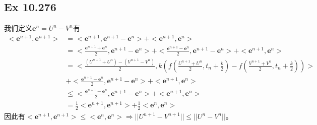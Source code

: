 \documentclass{article}
\begin{document}
\subsection*{Ex 10.276}
\indent 我们定义$\textbf{e}^{n}=U^{n}-V^{n}$有
\begin{equation*}
\begin{aligned}
<\textbf{e}^{n+1},\textbf{e}^{n+1}>&=<\textbf{e}^{n+1},\textbf{e}^{n+1}-\textbf{e}^{n}>+<\textbf{e}^{n+1},\textbf{e}^{n}>\\
&=<\frac{\textbf{e}^{n+1}+\textbf{e}^{n}}{2},\textbf{e}^{n+1}-\textbf{e}^{n}>+<\frac{\textbf{e}^{n+1}-\textbf{e}^{n}}{2},\textbf{e}^{n+1}-\textbf{e}^{n}>+<\textbf{e}^{n+1},\textbf{e}^n>\\
&=<\frac{(U^{n+1}+U^n)-(V^{n+1}-V^n)}{2},k(f(\frac{U^{n+1}+U^n}{2},t_n+\frac{k}{2})-f(\frac{V^{n+1}+V^n}{2},t_n+\frac{k}{2}))>\\
&+<\frac{\textbf{e}^{n+1}-\textbf{e}^{n}}{2},\textbf{e}^{n+1}-\textbf{e}^{n}>+<\textbf{e}^{n+1},\textbf{e}^n>\\
&\le<\frac{\textbf{e}^{n+1}-\textbf{e}^{n}}{2},\textbf{e}^{n+1}-\textbf{e}^{n}>+<\textbf{e}^{n+1},\textbf{e}^n>\\
&=\frac{1}{2}<\textbf{e}^{n+1},\textbf{e}^{n+1}>+\frac{1}{2}<\textbf{e}^n,\textbf{e}^n>
\end{aligned}
\end{equation*}
因此有$<\textbf{e}^{n+1},\textbf{e}^{n+1}>\le<\textbf{e}^n,\textbf{e}^n>\Rightarrow||U^{n+1}-V^{n+1}||\le||U^n-V^n||$。
\end{document}
